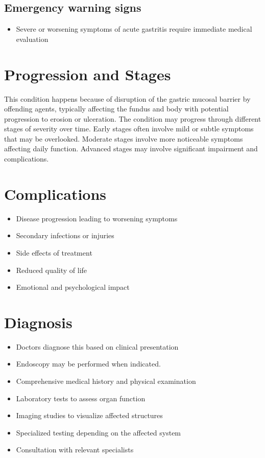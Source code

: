 \subsection{Emergency warning signs}
\begin{itemize}[noitemsep]
  \item Severe or worsening symptoms of acute gastritis require immediate medical evaluation
\end{itemize}
\section{Progression and Stages}
This condition happens because of disruption of the gastric mucosal barrier by offending agents, typically affecting the fundus and body with potential progression to erosion or ulceration. The condition may progress through different stages of severity over time. Early stages often involve mild or subtle symptoms that may be overlooked. Moderate stages involve more noticeable symptoms affecting daily function. Advanced stages may involve significant impairment and complications.
\section{Complications}
\begin{itemize}[noitemsep]
  \item Disease progression leading to worsening symptoms
  \item Secondary infections or injuries
  \item Side effects of treatment
  \item Reduced quality of life
  \item Emotional and psychological impact
\end{itemize}
\section{Diagnosis}
\begin{itemize}[noitemsep]
  \item Doctors diagnose this based on clinical presentation
  \item Endoscopy may be performed when indicated.
  \item Comprehensive medical history and physical examination
  \item Laboratory tests to assess organ function
  \item Imaging studies to visualize affected structures
  \item Specialized testing depending on the affected system
  \item Consultation with relevant specialists
\end{itemize}
